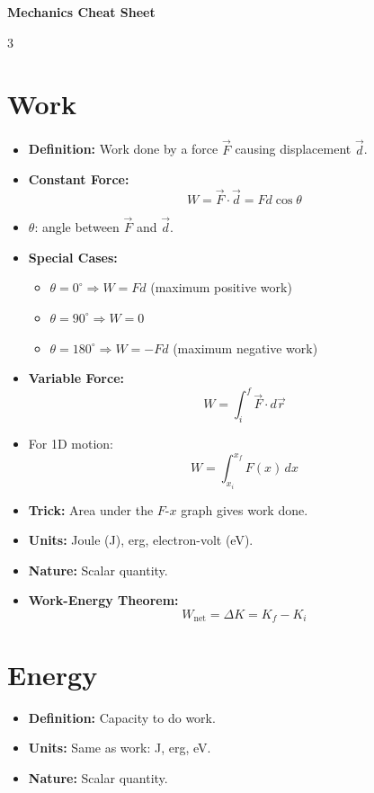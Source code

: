 \documentclass[10pt,a4paper]{article}
\newcommand{\defn}[1]{\textbf{Definition:} #1}
\newcommand{\units}[1]{\textbf{Units:} #1}
\newcommand{\nature}[1]{\textbf{Nature:} #1}
\newcommand{\important}[1]{\textbf{#1}}
\newcommand{\trick}[1]{\textbf{Trick:} #1}
\begin{document}
\footnotesize

\begin{center}
    {\Large \textbf{Mechanics Cheat Sheet}}
\end{center}

\vspace{-0.4em}

\begin{multicols}{3}
\raggedcolumns
\justifying

\section{Work}

\begin{itemize}
    \item \defn{Work done by a force $\vec{F}$ causing displacement $\vec{d}$.}
    \item \important{Constant Force:}
    \[
    W = \vec{F}\cdot\vec{d} = Fd\cos\theta
    \]
    \item $\theta$: angle between $\vec{F}$ and $\vec{d}$.
    \item \important{Special Cases:}
    \begin{itemize}
        \item $\theta = 0^\circ \Rightarrow W = Fd$ (maximum positive work)
        \item $\theta = 90^\circ \Rightarrow W = 0$
        \item $\theta = 180^\circ \Rightarrow W = -Fd$ (maximum negative work)
    \end{itemize}
    \item \important{Variable Force:}
    \[
    W = \int_{i}^{f} \vec{F}\cdot d\vec{r}
    \]
    \item For 1D motion:
    \[
    W = \int_{x_i}^{x_f} F(x)\,dx
    \]
    \item \trick{Area under the $F$-$x$ graph gives work done.}
    \item \units{Joule (J), erg, electron-volt (eV).}
    \item \nature{Scalar quantity.}
    \item \important{Work-Energy Theorem:}
    \[
    W_{\text{net}} = \Delta K = K_f - K_i
    \]
\end{itemize}

\section{Energy}

\begin{itemize}
    \item \defn{Capacity to do work.}
    \item \units{Same as work: J, erg, eV.}
    \item \nature{Scalar quantity.}
\end{itemize}


\end{multicols}
\end{document}
